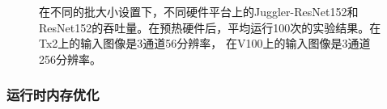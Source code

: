 \begin{figure}[t]
	\centering
	\caption{在不同的批大小设置下，不同硬件平台上的Juggler-ResNet152和ResNet152的吞吐量。在预热硬件后，平均运行100次的实验结果。在Tx2上的输入图像是3通道56分辨率， 在V100上的输入图像是3通道256分辨率。}
	\label{throughput}
\end{figure}


\subsubsection{运行时内存优化}

